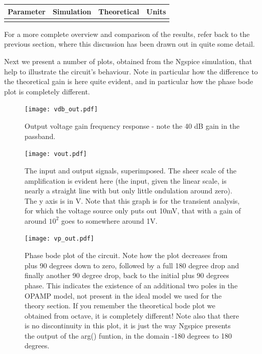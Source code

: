 \hfill
 \parbox{1\linewidth}{
  \centering
  \begin{tabular}{|l|l|l|r|}
    \hline    
    {\bf Parameter} & {\bf Simulation} & {\bf Theoretical } & {\bf Units }\\ \hline
    
  \label{tab:results2}
  \end{tabular}
  }
  
  For a more complete overview and comparison of the results, refer back to the previous section, where this discussion has been drawn out in quite some detail.

  
Next we present a number of plots, obtained from the Ngspice simulation, that help to illustrate the circuit's behaviour. Note in particular how the difference to the theoretical gain is here quite evident, and in particular how the phase bode plot is completely different.
  
\par
\vspace{-4cm}
\begin{figure}[H] \centering
\texttt{[image: vdb\_out.pdf]}
\vspace{-1cm}
\caption{Output voltage gain frequency response - note the 40 dB gain in the passband.}
\label{fig:gain_sim}
\end{figure}


\begin{figure}[H] \centering
\texttt{[image: vout.pdf]}
\caption{The input and output signals, superimposed. The sheer scale of the amplification is evident here (the input, given the linear scale, is nearly a straight line with but only little ondulation around zero). The y axis is in V. Note that this graph is for the transient analysis, for which the voltage source only puts out 10mV, that with a gain of around $10^{2}$ goes to somewhere around 1V.}
\label{fig:In_imp}
\end{figure}
\vspace{-3cm}


\begin{figure}[H] \centering
\texttt{[image: vp\_out.pdf]}
\caption{Phase bode plot of the circuit. Note how the plot decreases from plus 90 degrees down to zero, followed by a full 180 degree drop and finally another 90 degree drop, back to the initial plus 90 degrees phase. This indicates the existence of an additional two poles in the OPAMP model, not present in the ideal model we used for the theory section. If you remember the theoretical bode plot we obtained from octave, it is completely different! Note also that there is no discontinuity in this plot, it is just the way Ngspice presents the output of the arg() funtion, in the domain -180 degrees to 180 degrees.}
\label{fig:out_imp}
\end{figure}
\vspace{-3cm}


\pagebreak
